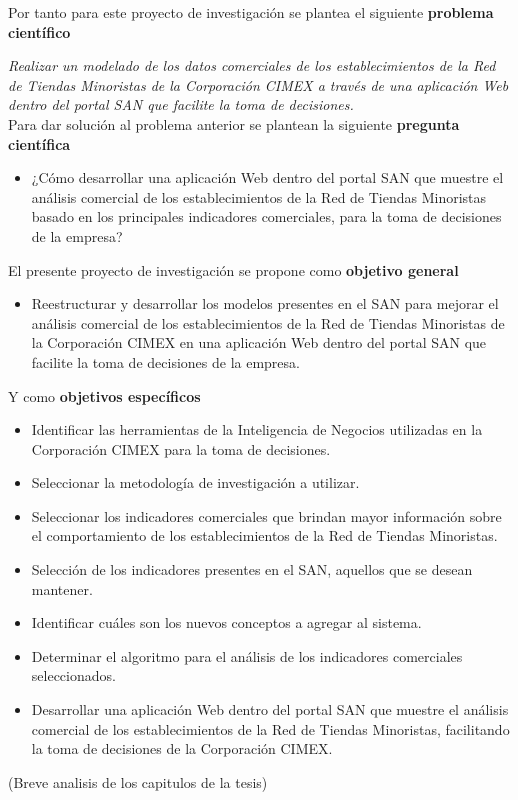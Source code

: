 Por tanto para este proyecto de investigación se plantea el siguiente \textbf{problema científico}

\textit{Realizar un modelado de los datos comerciales de los establecimientos de la Red de Tiendas Minoristas de la Corporación CIMEX a través de una aplicación Web dentro del  portal SAN que facilite la toma de decisiones.}\\

Para dar solución al problema anterior se plantean la siguiente \textbf{pregunta científica} 
\begin{itemize}
\item ¿Cómo desarrollar una aplicación Web dentro del portal SAN que muestre el análisis comercial de los establecimientos de la Red de Tiendas Minoristas basado en los principales indicadores comerciales, para la toma de decisiones de la empresa?
\end{itemize}

El presente proyecto de investigación se propone como \textbf{objetivo general}
\begin{itemize}
\item	Reestructurar y desarrollar  los modelos presentes en el SAN para mejorar el análisis comercial de los establecimientos de la Red de Tiendas Minoristas de la Corporación CIMEX en una aplicación Web dentro del portal SAN que facilite la toma de decisiones de la empresa.
\end{itemize}

Y como \textbf{objetivos específicos}
\begin{itemize}
\item	Identificar las herramientas de la Inteligencia de Negocios utilizadas en la Corporación CIMEX  para la toma de decisiones.
\item	Seleccionar la metodología de investigación a utilizar. 
\item	Seleccionar los indicadores comerciales que brindan mayor información sobre el comportamiento de los establecimientos de la Red de Tiendas Minoristas.
\item	Selección de los indicadores presentes en el SAN, aquellos que se desean mantener.
\item	Identificar cuáles son los nuevos conceptos a agregar al sistema.
\item	Determinar el algoritmo para el análisis de  los indicadores comerciales seleccionados. 
\item	Desarrollar una aplicación Web dentro del portal SAN que muestre el análisis comercial de los establecimientos de la Red de Tiendas Minoristas, facilitando la toma de decisiones de la Corporación CIMEX.
\end{itemize}

(Breve analisis de los capitulos de la tesis)

